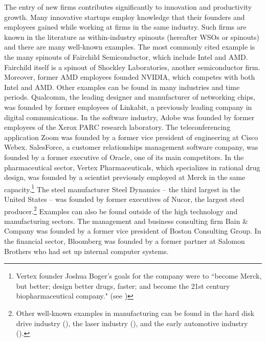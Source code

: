 \documentclass[ecta,nameyear,final]{econsocart}
\theoremstyle{plain}
\theoremstyle{remark}
\begin{document}
The entry of new firms contributes significantly to innovation and productivity growth. Many innovative startups employ knowledge that their founders and employees gained while working at firms in the same industry. Such firms are known in the literature as within-industry spinouts (hereafter WSOs or spinouts) and there are many well-known examples. The most commonly cited example is the many spinouts of Fairchild Semiconductor, which include Intel and AMD. Fairchild itself is a spinout of Shockley Laboratories, another semiconductor firm. Moreover, former AMD employees founded NVIDIA, which competes with both Intel and AMD. Other examples can be found in many industries and time periods. Qualcomm, the leading designer and manufacturer of networking chips, was founded by former employees of Linkabit, a previously leading company in digital communications. In the software industry, Adobe was founded by former employees of the Xerox PARC research laboratory. The teleconferencing application Zoom was founded by a former vice president of engineering at Cisco Webex. SalesForce, a customer relationships management software company, was founded by a former executive of Oracle, one of its main competitors. In the pharmaceutical sector, Vertex Pharmaceuticals, which specializes in rational drug design, was founded by a scientist previously employed at Merck in the same capacity.\footnote{Vertex founder Joshua Boger's goals for the company were to ``become Merck, but better; design better drugs, faster; and become the 21st century biopharmaceutical company." (see \cite{werth_antidote_2014})} The steel manufacturer Steel Dynamics -- the third largest in the United States -- was founded by former executives of Nucor, the largest steel producer.\footnote{Other well-known examples in manufacturing can be found in the hard disk drive industry (\cite{franco_spin-outs_2006}), the laser industry (\cite{klepper_entry_2005}), and the early automotive industry (\cite{klepper_disagreements_2007}).} Examples can also be found outside of the high technology and manufacturing sectors. The management and business consulting firm Bain \& Company was founded by a former vice president of Boston Consulting Group. In the financial sector, Bloomberg was founded by a former partner at Salomon Brothers who had set up internal computer systems.
\end{document}
